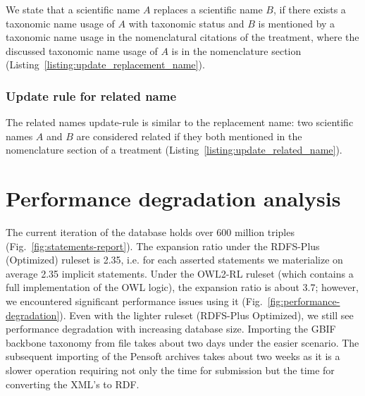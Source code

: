 We state that a scientific name $A$ replaces a scientific name $B$, if there exists a taxonomic name usage of $A$ with taxonomic status  and $B$ is mentioned by a taxonomic name usage in the nomenclatural citations of the treatment, where the discussed taxonomic name usage of $A$ is in the nomenclature section (Listing~\ref{listing:update_replacement_name}).



\subsubsection{Update rule for related name}

The related names update-rule is similar to the replacement name: two scientific names $A$ and $B$ are considered related if they both mentioned in the nomenclature section of a treatment (Listing~\ref{listing:update_related_name}).



\section{Performance degradation analysis}

The current iteration of the database holds over 600 million triples (Fig.~\ref{fig:statements-report}). The expansion ratio under the RDFS-Plus (Optimized) ruleset is 2.35, i.e. for each asserted statements we materialize on average 2.35 implicit statements. Under the OWL2-RL ruleset (which contains a full implementation of the OWL logic), the expansion ratio is about 3.7; however, we encountered significant performance issues using it (Fig.~\ref{fig:performance-degradation}). Even with the lighter ruleset (RDFS-Plus Optimized), we still see performance degradation with increasing database size. Importing the GBIF backbone taxonomy from file takes about two days under the easier scenario. The subsequent importing of the Pensoft archives takes about two weeks as it is a slower operation requiring not only the time for submission but the time for converting the XML's to RDF.

